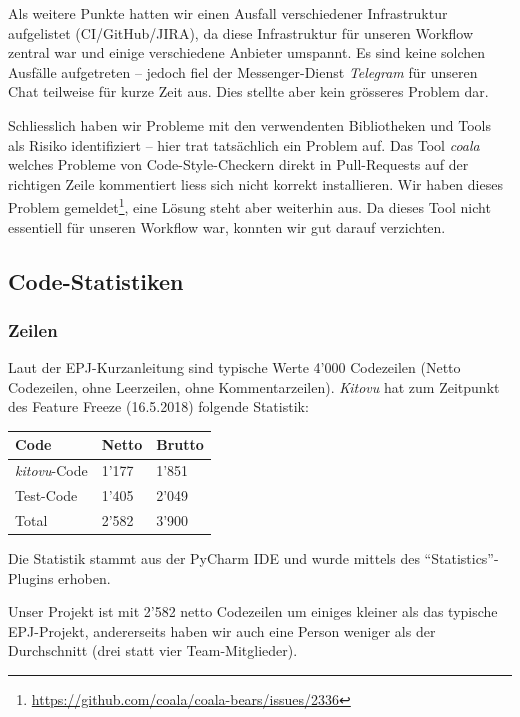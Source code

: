 \documentclass[a4paper]{article}
\begin{document}
Als weitere Punkte hatten wir einen Ausfall verschiedener Infrastruktur
aufgelistet (CI/GitHub/JIRA), da diese Infrastruktur für unseren Workflow
zentral war und einige verschiedene Anbieter umspannt. Es sind keine solchen
Ausfälle aufgetreten -- jedoch fiel der Messenger-Dienst \emph{Telegram} für
unseren Chat teilweise für kurze Zeit aus. Dies stellte aber kein grösseres
Problem dar.

Schliesslich haben wir Probleme mit den verwendenten Bibliotheken und Tools
als Risiko identifiziert -- hier trat tatsächlich ein Problem auf. Das Tool
\emph{coala} welches Probleme von Code-Style-Checkern direkt in
Pull-Requests auf der richtigen Zeile kommentiert liess sich nicht korrekt
installieren. Wir haben dieses Problem
gemeldet\footnote{\url{https://github.com/coala/coala-bears/issues/2336}}, eine
Lösung steht aber weiterhin aus. Da dieses Tool nicht essentiell für unseren
Workflow war, konnten wir gut darauf verzichten.

\subsection{Code-Statistiken}

\subsubsection{Zeilen}

Laut der EPJ-Kurzanleitung sind typische Werte 4'000 Codezeilen (Netto Codezeilen, ohne Leerzeilen, ohne Kommentarzeilen). \emph{Kitovu} hat zum Zeitpunkt des Feature Freeze (16.5.2018) folgende Statistik:

\begin{tabulary}{\linewidth}{lll}
  \toprule
  \textbf{Code} & \textbf{Netto} & \textbf{Brutto} \\
  \midrule
  \emph{kitovu}-Code & 1'177 & 1'851 \\
  Test-Code & 1'405 & 2'049 \\
  \midrule
  Total & 2'582 & 3'900 \\
  \bottomrule
\end{tabulary}

Die Statistik stammt aus der PyCharm IDE und wurde mittels des ``Statistics''-Plugins erhoben.

Unser Projekt ist mit 2'582 netto Codezeilen um einiges kleiner als das typische EPJ-Projekt, andererseits haben wir auch eine Person weniger als der Durchschnitt (drei statt vier Team-Mitglieder).
\end{document}
